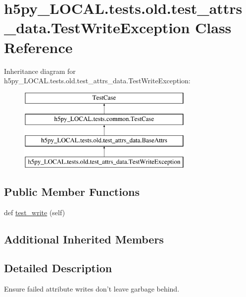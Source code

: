 \hypertarget{classh5py__LOCAL_1_1tests_1_1old_1_1test__attrs__data_1_1TestWriteException}{}\section{h5py\+\_\+\+L\+O\+C\+A\+L.\+tests.\+old.\+test\+\_\+attrs\+\_\+data.\+Test\+Write\+Exception Class Reference}
\label{classh5py__LOCAL_1_1tests_1_1old_1_1test__attrs__data_1_1TestWriteException}
Inheritance diagram for h5py\+\_\+\+L\+O\+C\+A\+L.\+tests.\+old.\+test\+\_\+attrs\+\_\+data.\+Test\+Write\+Exception\+:\begin{figure}[H]
\begin{center}
\leavevmode
\includegraphics[height=4.000000cm]{classh5py__LOCAL_1_1tests_1_1old_1_1test__attrs__data_1_1TestWriteException}
\end{center}
\end{figure}
\subsection*{Public Member Functions}
\begin{DoxyCompactItemize}
\item 
def \hyperlink{classh5py__LOCAL_1_1tests_1_1old_1_1test__attrs__data_1_1TestWriteException_acb4d082f513ebda5aa6653908e45fe19}{test\+\_\+write} (self)
\end{DoxyCompactItemize}
\subsection*{Additional Inherited Members}


\subsection{Detailed Description}
\begin{DoxyVerb}    Ensure failed attribute writes don't leave garbage behind.
\end{DoxyVerb}
 

